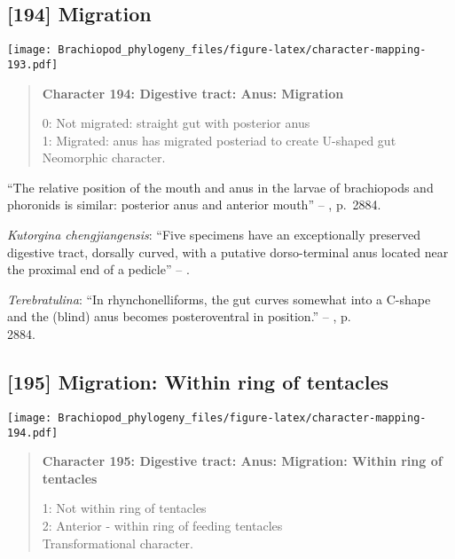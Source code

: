 \documentclass[openany]{book}
\theoremstyle{definition}
\theoremstyle{definition}
\theoremstyle{definition}
\theoremstyle{remark}
\begin{document}
\subsection*{{[}194{]} Migration}\label{migration}

\texttt{[image: Brachiopod\_phylogeny\_files/figure-latex/character-mapping-193.pdf]}

\begin{quote}
\textbf{Character 194: Digestive tract: Anus: Migration}

0: Not migrated: straight gut with posterior anus\\
1: Migrated: anus has migrated posteriad to create U-shaped gut\\
Neomorphic character.
\end{quote}

``The relative position of the mouth and anus in the larvae of
brachiopods and phoronids is similar: posterior anus and anterior
mouth'' -- \citet{Williams2007Supplement}, p.~2884.

\hypertarget{Kutorgina_chengjiangensis-coding-194}{}
\emph{Kutorgina chengjiangensis}: ``Five specimens have an exceptionally
preserved digestive tract, dorsally curved, with a putative
dorso-terminal anus located near the proximal end of a pedicle'' --
\citet{Zhang2007Rhynchonelliformeanbrachiopods}.

\hypertarget{Terebratulina-coding-194}{}
\emph{Terebratulina}: ``In rhynchonelliforms, the gut curves somewhat
into a C-shape and the (blind) anus becomes posteroventral in
position.'' -- \citet{Williams2007Supplement}, p.\\
2884.

\subsection*{{[}195{]} Migration: Within ring of
tentacles}\label{migration-within-ring-of-tentacles}

\texttt{[image: Brachiopod\_phylogeny\_files/figure-latex/character-mapping-194.pdf]}

\begin{quote}
\textbf{Character 195: Digestive tract: Anus: Migration: Within ring of
tentacles}

1: Not within ring of tentacles\\
2: Anterior - within ring of feeding tentacles\\
Transformational character.
\end{quote}
\end{document}
